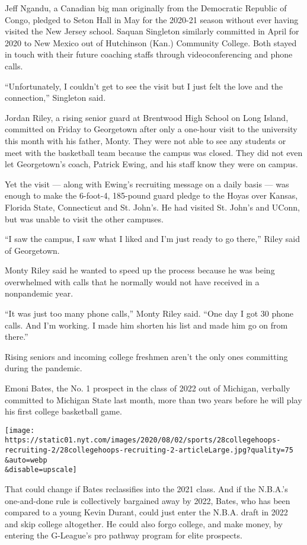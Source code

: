 Jeff Ngandu, a Canadian big man originally from the Democratic Republic
of Congo, pledged to Seton Hall in May for the 2020-21 season without
ever having visited the New Jersey school. Saquan Singleton similarly
committed in April for 2020 to New Mexico out of Hutchinson (Kan.)
Community College. Both stayed in touch with their future coaching
staffs through videoconferencing and phone calls.

``Unfortunately, I couldn't get to see the visit but I just felt the
love and the connection,'' Singleton said.

Jordan Riley, a rising senior guard at Brentwood High School on Long
Island, committed on Friday to Georgetown after only a one-hour visit to
the university this month with his father, Monty. They were not able to
see any students or meet with the basketball team because the campus was
closed. They did not even let Georgetown's coach, Patrick Ewing, and his
staff know they were on campus.

Yet the visit --- along with Ewing's recruiting message on a daily basis
--- was enough to make the 6-foot-4, 185-pound guard pledge to the Hoyas
over Kansas, Florida State, Connecticut and St. John's. He had visited
St. John's and UConn, but was unable to visit the other campuses.

``I saw the campus, I saw what I liked and I'm just ready to go there,''
Riley said of Georgetown.

Monty Riley said he wanted to speed up the process because he was being
overwhelmed with calls that he normally would not have received in a
nonpandemic year.

``It was just too many phone calls,'' Monty Riley said. ``One day I got
30 phone calls. And I'm working. I made him shorten his list and made
him go on from there.''

Rising seniors and incoming college freshmen aren't the only ones
committing during the pandemic.

Emoni Bates, the No. 1 prospect in the class of 2022 out of Michigan,
verbally committed to Michigan State last month, more than two years
before he will play his first college basketball game.

\texttt{[image: https://static01.nyt.com/images/2020/08/02/sports/28collegehoops-recruiting-2/28collegehoops-recruiting-2-articleLarge.jpg?quality=75\\\&auto=webp\\\&disable=upscale]}

That could change if Bates reclassifies into the 2021 class. And if the
N.B.A.'s one-and-done rule is collectively bargained away by 2022,
Bates, who has been compared to a young Kevin Durant, could just enter
the N.B.A. draft in 2022 and skip college altogether. He could also
forgo college, and make money, by entering the G-League's pro pathway
program for elite prospects.

